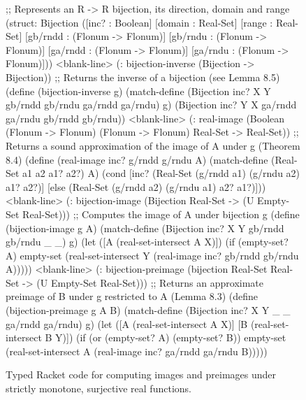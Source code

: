 \begin{figure}[tb!]\centering
\begin{schemedisplay}
;; Represents an R -> R bijection, its direction, domain and range
(struct: Bijection
    ([inc? : Boolean] [domain : Real-Set] [range : Real-Set]
     [gb/rndd : (Flonum -> Flonum)] [gb/rndu : (Flonum -> Flonum)]
     [ga/rndd : (Flonum -> Flonum)] [ga/rndu : (Flonum -> Flonum)]))
<blank-line>
(: bijection-inverse (Bijection -> Bijection))
;; Returns the inverse of a bijection (see Lemma 8.5)
(define (bijection-inverse g)
  (match-define (Bijection inc? X Y gb/rndd gb/rndu ga/rndd ga/rndu) g)
  (Bijection inc? Y X ga/rndd ga/rndu gb/rndd gb/rndu))
<blank-line>
(: real-image (Boolean (Flonum -> Flonum) (Flonum -> Flonum) Real-Set
                -> Real-Set))
;; Returns a sound approximation of the image of A under g (Theorem 8.4)
(define (real-image inc? g/rndd g/rndu A)
  (match-define (Real-Set a1 a2 a1? a2?) A)
  (cond [inc?  (Real-Set (g/rndd a1) (g/rndu a2) a1? a2?)]
        [else  (Real-Set (g/rndd a2) (g/rndu a1) a2? a1?)]))
<blank-line>
(: bijection-image (Bijection Real-Set -> (U Empty-Set Real-Set)))
;; Computes the image of A under bijection g
(define (bijection-image g A)
  (match-define (Bijection inc? X Y gb/rndd gb/rndu _ _) g)
  (let ([A  (real-set-intersect A X)])
    (if (empty-set? A)
        empty-set
        (real-set-intersect Y (real-image inc? gb/rndd gb/rndu A)))))
<blank-line>
(: bijection-preimage (bijection Real-Set Real-Set -> (U Empty-Set Real-Set)))
;; Returns an approximate preimage of B under g restricted to A (Lemma 8.3)
(define (bijection-preimage g A B)
  (match-define (Bijection inc? X Y _ _ ga/rndd ga/rndu) g)
  (let ([A  (real-set-intersect A X)]
        [B  (real-set-intersect B Y)])
    (if (or (empty-set? A) (empty-set? B))
        empty-set
        (real-set-intersect A (real-image inc? ga/rndd ga/rndu B)))))
\end{schemedisplay}
\bottomhrule
\caption[Computing images and preimages under real functions]{Typed Racket code for computing images and preimages under strictly monotone, surjective real functions.}
\label{fig:bijection-implementation}
\end{figure}

